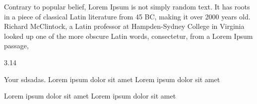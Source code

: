 Contrary to popular belief, Lorem Ipsum is not simply random text. It has roots in a piece of classical
Latin literature from 45 BC, making it over 2000 years old. Richard McClintock, a Latin professor at Hampden-Sydney College in Virginia
looked up one of the more obscure Latin words, consectetur, from a Lorem Ipsum passage,



3.14



\begin{itemize}
Your sdsadas. Lorem ipsum dolor sit amet
Lorem ipsum dolor sit amet
\end{itemize}



Lorem ipsum dolor sit amet
Lorem ipsum dolor sit amet

